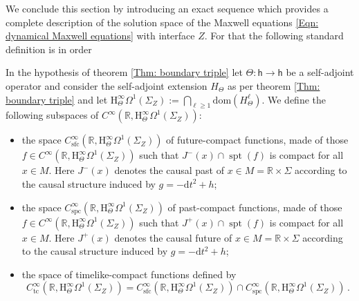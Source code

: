 We conclude this section by introducing an exact sequence which provides a complete description of the solution space of the Maxwell equations \eqref{Eqn: dynamical Maxwell equations} with interface $Z$.
For that the following standard definition is in order \nicomment{[Cit.]}
\begin{Definition}\label{Def: future,past,timelike-compact functions}
	In the hypothesis of theorem \ref{Thm: boundary triple} let $\Theta\colon\mathsf{h}\to\mathsf{h}$ be a self-adjoint operator and consider the self-adjoint extension $H_\Theta$ as per theorem \ref{Thm: boundary triple} and let $\mathrm{H}^\infty_\Theta\Omega^1(\Sigma_Z):=\bigcap_{\ell\geq 1}\mathrm{dom}(H_\Theta^\ell)$.
	We define the following subspaces of $C^\infty(\mathbb{R},\mathrm{H}^\infty_\Theta\Omega^1(\Sigma_Z))$:
	\begin{itemize}
		\item
		the space $C^\infty_{\mathrm{sfc}}(\mathbb{R},\mathrm{H}^\infty_\Theta\Omega^1(\Sigma_Z))$ of future-compact functions, made of those $f\in C^\infty(\mathbb{R},\mathrm{H}^\infty_\Theta\Omega^1(\Sigma_Z))$ such that $J^-(x)\cap\operatorname{spt}(f)$ is compact for all $x\in M$.
		Here $J^-(x)$ denotes the causal past of $x\in M=\mathbb{R}\times\Sigma$ according to the causal structure induced by $g=-\mathrm{d}t^2+h$;
		\item
		the space $C^\infty_{\mathrm{spc}}(\mathbb{R},\mathrm{H}^\infty_\Theta\Omega^1(\Sigma_Z))$ of past-compact functions, made of those $f\in C^\infty(\mathbb{R},\mathrm{H}^\infty_\Theta\Omega^1(\Sigma_Z))$ such that $J^+(x)\cap\operatorname{spt}(f)$ is compact for all $x\in M$.
		Here $J^+(x)$ denotes the causal future of $x\in M=\mathbb{R}\times\Sigma$ according to the causal structure induced by $g=-\mathrm{d}t^2+h$;
		\item 
		the space of timelike-compact functions defined by $$C^\infty_{\mathrm{tc}}(\mathbb{R},\mathrm{H}^\infty_\Theta\Omega^1(\Sigma_Z))=C^\infty_{\mathrm{sfc}}(\mathbb{R},\mathrm{H}^\infty_\Theta\Omega^1(\Sigma_Z))\cap C^\infty_{\mathrm{spc}}(\mathbb{R},\mathrm{H}^\infty_\Theta\Omega^1(\Sigma_Z))\,.$$
\end{itemize}
\end{Definition}
